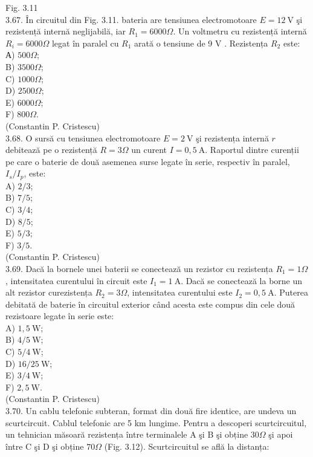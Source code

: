 \documentclass[10pt]{article}
\begin{document}
Fig. 3.11\\
3.67. În circuitul din Fig. 3.11. bateria are tensiunea electromotoare $E=12 \mathrm{~V}$ şi rezistență internă neglijabilă, iar $R_{1}=6000 \Omega$. Un voltmetru cu rezistență internă $R_{i}=6000 \Omega$ legat în paralel cu $R_{1}$ arată o tensiune de 9 V . Rezistența $R_{2}$ este:\\
А) $500 \Omega$;\\
B) $3500 \Omega$;\\
C) $1000 \Omega$;\\
D) $2500 \Omega$;\\
E) $6000 \Omega$;\\
F) $800 \Omega$.\\
(Constantin P. Cristescu)\\
3.68. O sursă cu tensiunea electromotoare $E=2 \mathrm{~V}$ şi rezistența internă $r$ debitează pe o rezistență $R=3 \Omega$ un curent $I=0,5 \mathrm{~A}$. Raportul dintre curenții pe care o baterie de două asemenea surse legate în serie, respectiv în paralel, $I_{s} / I_{p}$, este:\\
A) $2 / 3$;\\
B) $7 / 5$;\\
C) $3 / 4$;\\
D) $8 / 5$;\\
E) $5 / 3$;\\
F) $3 / 5$.\\
(Constantin P. Cristescu)\\
3.69. Dacă la bornele unei baterii se conectează un rezistor cu rezistența $R_{1}=1 \Omega$, intensitatea curentului în circuit este $I_{1}=1 \mathrm{~A}$. Dacă se conectează la borne un alt rezistor curezistența $R_{2}=3 \Omega$, intensitatea curentului este $I_{2}=0,5 \mathrm{~A}$. Puterea debitată de baterie în circuitul exterior când acesta este compus din cele două rezistoare legate în serie este:\\
A) $1,5 \mathrm{~W}$;\\
B) $4 / 5 \mathrm{~W}$;\\
C) $5 / 4 \mathrm{~W}$;\\
D) $16 / 25 \mathrm{~W}$;\\
E) $3 / 4 \mathrm{~W}$;\\
F) $2,5 \mathrm{~W}$.\\
(Constantin P. Cristescu)\\
3.70. Un cablu telefonic subteran, format din două fire identice, are undeva un scurtcircuit. Cablul telefonic are 5 km lungime. Pentru a descoperi scurtcircuitul, un tehnician măsoară rezistența între terminalele A şi B şi obține $30 \Omega$ şi apoi între C şi D şi obține $70 \Omega$ (Fig. 3.12). Scurtcircuitul se află la distanța:\\
\end{document}
